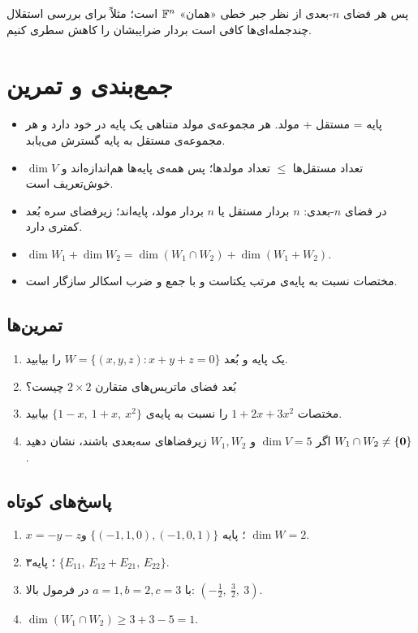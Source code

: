 \begin{note}
پس هر فضای $n$-بعدی از نظر جبر خطی «همان» $\mathbb{F}^n$ است؛ مثلاً برای بررسی استقلال چندجمله‌ای‌ها کافی است بردار ضرایبشان را کاهش سطری کنیم.
\end{note}

\section{جمع‌بندی و تمرین}

\begin{summary}
\begin{itemize}
  \item پایه = مستقل + مولد. هر مجموعه‌ی مولد  متناهی یک پایه در خود دارد و هر مجموعه‌ی مستقل به پایه گسترش می‌یابد.
  \item تعداد مستقل‌ها $\le$ تعداد مولدها؛ پس همه‌ی پایه‌ها هم‌اندازه‌اند و $\dim V$ خوش‌تعریف است.
  \item در فضای $n$-بعدی: $n$ بردار مستقل یا $n$ بردار مولد، پایه‌اند؛ زیرفضای سره  بُعد کمتری دارد.
  \item $\dim W_1+\dim W_2=\dim(W_1\cap W_2)+\dim(W_1+W_2)$.
  \item مختصات نسبت به پایه‌ی مرتب یکتاست و با جمع و ضرب اسکالر سازگار  است.
\end{itemize}
\end{summary}

\subsection*{تمرین‌ها}
\begin{enumerate}
  \item یک پایه و بُعد $W=\{(x,y,z): x+y+z=0\}$ را بیابید.
  \item بُعد فضای ماتریس‌های متقارن  $2\times2$ چیست؟
  \item مختصات $1+2x+3x^2$ را نسبت به پایه‌ی $\{1-x,\ 1+x,\ x^2\}$ بیابید.
  \item اگر $\dim V=5$ و $W_1,W_2$ زیرفضاهای سه‌بعدی باشند، نشان دهید $W_1\cap W_2\neq\{\mathbf{0}\}$.
\end{enumerate}

\subsection*{پاسخ‌های کوتاه}
\begin{enumerate}
  \item $x=-y-z$؛ پایه $\{(-1,1,0),(-1,0,1)\}$ و $\dim W=2$.
  \item ۳؛ پایه $\{E_{11},\,E_{12}+E_{21},\,E_{22}\}$.
  \item با $a=1,b=2,c=3$ در فرمول بالا: $(-\frac12,\ \frac32,\ 3)$.
  \item $\dim(W_1\cap W_2)\ge3+3-5=1$.
\end{enumerate}
